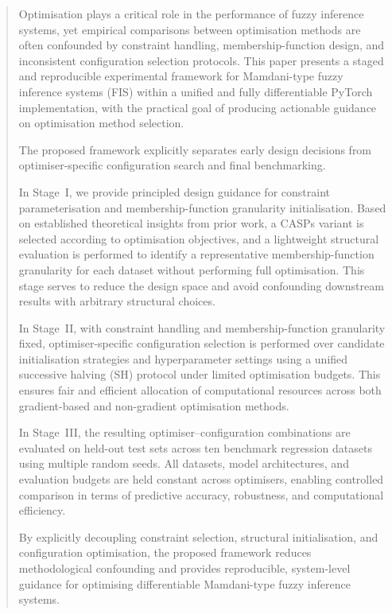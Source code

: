 \documentclass[a4paper,12pt,oneside]{article}
\begin{document}
\begin{abstract}
Optimisation plays a critical role in the performance of fuzzy inference systems,
yet empirical comparisons between optimisation methods are often confounded by
constraint handling, membership-function design, and inconsistent configuration
selection protocols.
This paper presents a staged and reproducible experimental framework for
Mamdani-type fuzzy inference systems (FIS) within a unified and fully
differentiable PyTorch implementation, with the practical goal of producing
actionable guidance on optimisation method selection.

The proposed framework explicitly separates early design decisions from
optimiser-specific configuration search and final benchmarking.

In Stage~I, we provide principled design guidance for constraint parameterisation
and membership-function granularity initialisation.
Based on established theoretical insights from prior work, a CASPs variant is
selected according to optimisation objectives, and a lightweight structural evaluation is performed to identify a representative
membership-function granularity for each dataset without performing full optimisation.
This stage serves to reduce the design space and avoid confounding downstream
results with arbitrary structural choices.

In Stage~II, with constraint handling and membership-function granularity fixed,
optimiser-specific configuration selection is performed over candidate
initialisation strategies and hyperparameter settings using a unified successive
halving (SH) protocol under limited optimisation budgets.
This ensures fair and efficient allocation of computational resources across
both gradient-based and non-gradient optimisation methods.

In Stage~III, the resulting optimiser--configuration combinations are evaluated
on held-out test sets across ten benchmark regression datasets using multiple
random seeds.
All datasets, model architectures, and evaluation budgets are held constant
across optimisers, enabling controlled comparison in terms of predictive
accuracy, robustness, and computational efficiency.

By explicitly decoupling constraint selection, structural initialisation, and
configuration optimisation, the proposed framework reduces methodological
confounding and provides reproducible, system-level guidance for optimising
differentiable Mamdani-type fuzzy inference systems.
\end{abstract}
\end{document}
